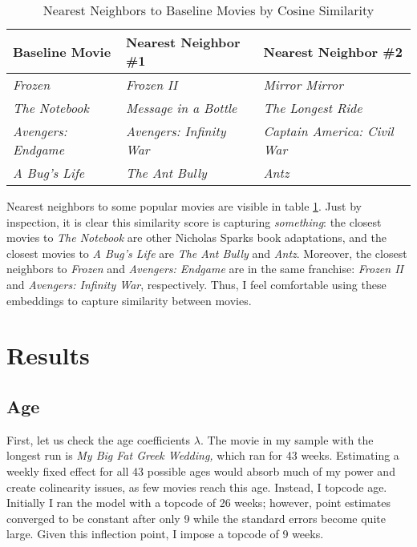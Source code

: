 \documentclass{article}
\begin{document}
\begin{table}[]
    \begin{center}
        \begin{tabular}{@{}lll@{}}
        \toprule
        \textbf{Baseline Movie}    & \textbf{Nearest Neighbor \#1}   & \textbf{Nearest Neighbor \#2}       \\ \midrule
        \textit{Frozen}            & \textit{Frozen II}              & \textit{Mirror Mirror}              \\
        \textit{The Notebook}      & \textit{Message in a Bottle}    & \textit{The Longest Ride}           \\
        \textit{Avengers: Endgame} & \textit{Avengers: Infinity War} & \textit{Captain America: Civil War} \\
        \textit{A Bug's Life}      & \textit{The Ant Bully}          & \textit{Antz}                       \\ \bottomrule
        \end{tabular}
        \caption{Nearest Neighbors to Baseline Movies by Cosine Similarity}
        \label{tab:cosine}
    \end{center}
\end{table}

Nearest neighbors to some popular movies are visible in table \ref{tab:cosine}. Just by inspection, it is clear this similarity score is capturing \emph{something}: the closest movies to \emph{The Notebook} are other Nicholas Sparks book adaptations, and the closest movies to \emph{A Bug's Life} are \emph{The Ant Bully} and \emph{Antz}. Moreover, the closest neighbors to \emph{Frozen} and \emph{Avengers: Endgame} are in the same franchise: \emph{Frozen II} and \emph{Avengers: Infinity War}, respectively. Thus, I feel comfortable using these embeddings to capture similarity between movies.

\section{Results}

\subsection{Age}

First, let us check the age coefficients $\lambda$. The movie in my sample with the longest run is \emph{My Big Fat Greek Wedding,} which ran for 43 weeks. Estimating a weekly fixed effect for all 43 possible ages would absorb much of my power and create colinearity issues, as few movies reach this age. Instead, I topcode age. Initially I ran the model with a topcode of 26 weeks; however, point estimates converged to be constant after only 9 while the standard errors become quite large. Given this inflection point, I impose a topcode of 9 weeks.
\end{document}
